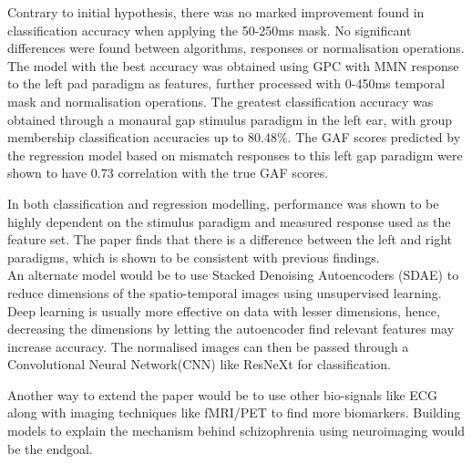\documentclass[10pt]{article}
\begin{document}
  Contrary to initial hypothesis, there was no marked improvement found in classification accuracy when applying the 50-250ms mask. No significant differences were found between algorithms, responses or normalisation operations.
  The model with the best accuracy was obtained using GPC with MMN response to the left pad paradigm as features, further processed with 0-450ms temporal mask and normalisation operations.
  The greatest classification accuracy was obtained through a monaural gap stimulus paradigm in the left ear, with group membership classification accuracies up to 80.48\%.
  The GAF scores predicted by the regression model based on mismatch responses to this left gap paradigm were shown to have 0.73 correlation with the true GAF scores.

  In both classification and regression modelling, performance was shown to be highly dependent on the stimulus paradigm and measured response used as the feature set. The paper finds that there is a difference between the left and right paradigms, which is shown to be consistent with previous findings.\\

  An alternate model would be to use Stacked Denoising Autoencoders (SDAE) to reduce dimensions of the spatio-temporal images using unsupervised learning. Deep learning is usually more effective on data with lesser dimensions, hence, decreasing the dimensions by letting the autoencoder find relevant features may increase accuracy. The normalised images can then be passed through a Convolutional Neural Network(CNN) like ResNeXt for classification.

  Another way to extend the paper would be to use other bio-signals like ECG along with imaging techniques like fMRI/PET to find more biomarkers.
  Building models to explain the mechanism behind schizophrenia using neuroimaging would be the endgoal.
\end{document}
